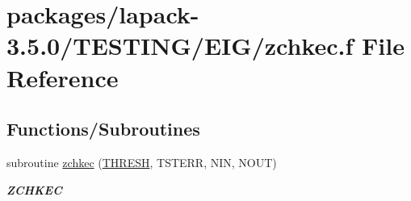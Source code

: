 \hypertarget{zchkec_8f}{}\section{packages/lapack-\/3.5.0/\+T\+E\+S\+T\+I\+N\+G/\+E\+I\+G/zchkec.f File Reference}
\label{zchkec_8f}
\subsection*{Functions/\+Subroutines}
\begin{DoxyCompactItemize}
\item 
subroutine \hyperlink{group__complex16__eig_gab88590f7d1eca9dc769c0be30a6d16c3}{zchkec} (\hyperlink{zlaqgs_8c_a0656018abfc9fa2821827415f5d5ea57}{T\+H\+R\+E\+S\+H}, T\+S\+T\+E\+R\+R, N\+I\+N, N\+O\+U\+T)
\begin{DoxyCompactList}\small\item\em {\bfseries Z\+C\+H\+K\+E\+C} \end{DoxyCompactList}\end{DoxyCompactItemize}
